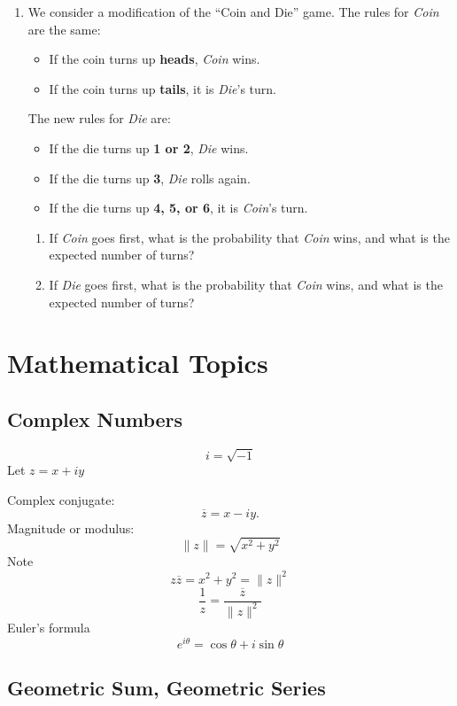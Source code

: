 \documentclass[reqno]{immbook}
\numberwithin{equation}{chapter}
\numberwithin{question}{section}
\numberwithin{theorem}{chapter}
\numberwithin{figure}{chapter}
\theoremstyle{definition}
\begin{document}
\begin{enumerate}
%
\item
\label{ex:markov3}
We consider a modification of the ``Coin and Die'' game.
The rules for \emph{Coin} are the same:
\begin{itemize}
\item If the coin turns up \textbf{heads}, \emph{Coin} wins.
\item If the coin turns up \textbf{tails}, it is \emph{Die}'s turn.
\end{itemize}
The new rules for \emph{Die} are:
\begin{itemize}
\item If the die turns up \textbf{1 or 2}, \emph{Die} wins.
\item If the die turns up \textbf{3}, \emph{Die} rolls again.
\item If the die turns up \textbf{4, 5, or 6}, it is \emph{Coin}'s turn.
\end{itemize}                                                                \begin{enumerate}
\item If \emph{Coin} goes first, what is the probability that
\emph{Coin} wins, and what is the expected number of turns?
\item If \emph{Die} goes first, what is the probability that
\emph{Coin} wins, and what is the expected number of turns?
\end{enumerate}
\end{enumerate}

%
\appendix
%
%
%

\chapter{Mathematical Topics}
%
%
\section{Complex Numbers}
%
\[
    i = \sqrt{-1}
\]
Let $z=x+iy$

\medskip
\noindent
Complex conjugate:
\[
   \overline{z} = x-iy.
\]
Magnitude or modulus:
\[
   \| z \| = \sqrt{x^2+y^2}
\]
Note
\[
   z \overline{z} = x^2+y^2 = \| z \|^2
\]
\[
   \frac{1}{z} = \frac{\overline{z}}{\|z\|^2}
\]
Euler's formula
\begin{equation}
   e^{i\theta} = \cos\theta + i \sin\theta
   \label{eqn:EULER}
\end{equation}
%
\section{Geometric Sum, Geometric Series}
\end{document}
